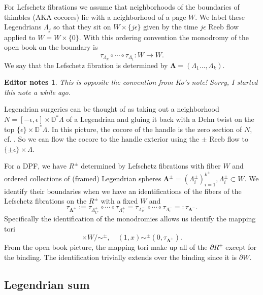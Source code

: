 \documentclass[11pt]{amsart}
\newcommand{\thicc}[1]{\pmb{#1}}
\newcommand{\disk}{\mathbb{D}}
\newcommand{\posNegRegion}{R^{\pm}}
\newcommand{\Leg}{\Lambda}
\newcommand{\posLeg}{\Leg^{+}}
\newcommand{\negLeg}{\Leg^{-}}
\newcommand{\thiccLeg}{\thicc{\Leg}}
\newcommand{\thiccPosLeg}{\thicc{\Leg}^{+}}
\newcommand{\thiccNegLeg}{\thicc{\Leg}^{-}}
\newcommand{\thiccPosNegLeg}{\thicc{\Leg}^{\pm}}
\newcommand{\posNegLeg}{\Leg^{\pm}}
\newtheorem{edits}[thm]{Editor notes}
\begin{document}
For Lefschetz fibrations we assume that neighborhoods of the boundaries of thimbles (AKA cocores) lie with a neighborhood of a page $W$. We label these Legendrians $\Leg_{j}$ so that they sit on $W \times \{ j \epsilon \}$ given by the time $j\epsilon$ Reeb flow applied to $W = W \times \{ 0 \}$. With this ordering convention the monodromy of the open book on the boundary is
\begin{equation*}
\tau_{\Leg_{k}} \circ \cdots \circ \tau_{\Leg_{1}}: W \rightarrow W.
\end{equation*}
We say that the Lefschetz fibration is determined by $\thiccLeg = (\Leg_{1} \dots, \Leg_{k})$.

\begin{edits}
This is opposite the convention from Ko's note! Sorry, I started this note a while ago.
\end{edits}

Legendrian surgeries can be thought of as taking out a neighborhood $N = [-\epsilon, \epsilon] \times \disk^{\ast}\Leg$ of a Legendrian and gluing it back with a Dehn twist on the top $\{ \epsilon\} \times \disk^{\ast}\Leg$. In this picture, the cocore of the handle is the zero section of $N$, cf. \cite[\S 10]{Avdek:Dynamics}. So we can flow the cocore to the handle exterior using the $\pm$ Reeb flow to $\{ \pm \epsilon \} \times \Leg$.

For a DPF, we have $\posNegRegion$ determined by Lefschetz fibrations with fiber $W$ and ordered collections of (framed) Legendrian spheres $\thiccPosNegLeg = (\posNegLeg_{i})_{i=1}^{k^{\pm}}, \posNegLeg_{i} \subset W$. We identify their boundaries when we have an identifications of the fibers of the Lefschetz fibrations on the $\posNegRegion$ with a fixed $W$ and
\begin{equation*}
\tau_{\thiccPosLeg} := \tau_{\posLeg_{k^{+}}} \circ \cdots \circ \tau_{\posLeg_{1}} = \tau_{\negLeg_{k^{-}}} \circ \cdots \circ \tau_{\negLeg_{1}} =: \tau_{\thiccNegLeg}.
\end{equation*}
Specifically the identification of the monodromies allows us identify the mapping tori
\begin{equation*}
[0, 1] \times W/ \sim^{\pm}, \quad (1, x) \sim^{\pm} (0, \tau_{\thiccPosNegLeg}).
\end{equation*}
From the open book picture, the mapping tori make up all of the $\partial \posNegRegion$ except for the binding. The identification trivially extends over the binding since it is $\partial W$.

\subsection{Legendrian sum}
\end{document}
